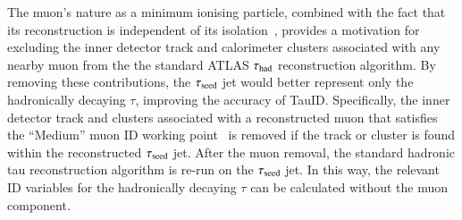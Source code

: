         The muon's nature as a minimum ionising particle, combined with the fact 
        that its reconstruction is independent of its isolation~\cite{MUON-2018-03}, 
        provides a motivation for excluding the inner detector track and calorimeter 
        clusters associated with any nearby muon from the the standard ATLAS $\tau_{\text{had}}$ reconstruction algorithm. 
        By removing these contributions, the $\tau_\mathrm{seed}$ jet would better represent 
        only the hadronically decaying $\tau$, improving the accuracy of TauID.
        Specifically, the inner detector track and clusters associated with a reconstructed muon that 
        satisfies the ``Medium'' muon ID working point~\cite{MUON-2018-03} 
        is removed if the track or cluster is found within the reconstructed $\tau_\mathrm{seed}$ jet. 
        After the muon removal, the standard 
        hadronic tau reconstruction algorithm is re-run on the $\tau_\mathrm{seed}$ jet. In this way, the relevant ID variables for 
        the hadronically decaying $\tau$ can be calculated without the muon component.

